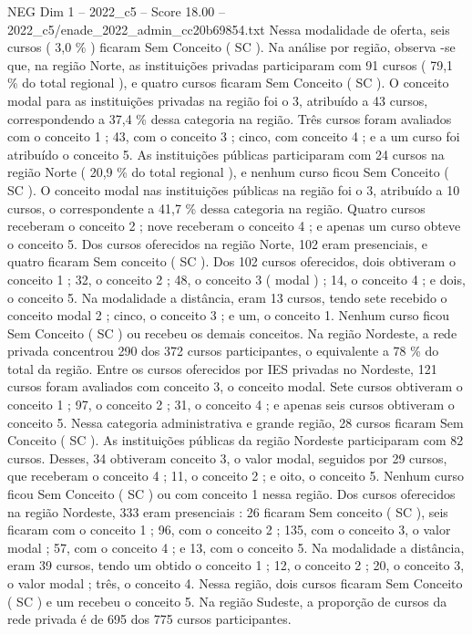 \begin{textsample}{NEG Dim 1 – 2022\_c5 – Score 18.00 – 2022\_c5/enade\_2022\_admin\_cc20b69854.txt}
Nessa modalidade de oferta, seis cursos ( 3,0 \% ) ficaram Sem Conceito ( SC ).
Na análise por região, observa -se que, na região Norte, as instituições privadas participaram com 91 cursos ( 79,1 \% do total regional ), e quatro cursos ficaram Sem Conceito ( SC ).
O conceito modal para as instituições privadas na região foi o 3, atribuído a 43 cursos, correspondendo a 37,4 \% dessa categoria na região.
Três cursos foram avaliados com o conceito 1 ; 43, com o conceito 3 ; cinco, com conceito 4 ; e a um curso foi atribuído o conceito 5.
As instituições públicas participaram com 24 cursos na região Norte ( 20,9 \% do total regional ), e nenhum curso ficou Sem Conceito ( SC ).
O conceito modal nas instituições públicas na região foi o 3, atribuído a 10 cursos, o correspondente a 41,7 \% dessa categoria na região.
Quatro cursos receberam o conceito 2 ; nove receberam o conceito 4 ; e apenas um curso obteve o conceito 5.
Dos cursos oferecidos na região Norte, 102 eram presenciais, e quatro ficaram Sem conceito ( SC ).
Dos 102 cursos oferecidos, dois obtiveram o conceito 1 ; 32, o conceito 2 ; 48, o conceito 3 ( modal ) ; 14, o conceito 4 ; e dois, o conceito 5.
Na modalidade a distância, eram 13 cursos, tendo sete recebido o conceito modal 2 ; cinco, o conceito 3 ; e um, o conceito 1.
Nenhum curso ficou Sem Conceito ( SC ) ou recebeu os demais conceitos.
Na região Nordeste, a rede privada concentrou 290 dos 372 cursos participantes, o equivalente a 78 \% do total da região.
Entre os cursos oferecidos por IES privadas no Nordeste, 121 cursos foram avaliados com conceito 3, o conceito modal.
Sete cursos obtiveram o conceito 1 ; 97, o conceito 2 ; 31, o conceito 4 ; e apenas seis cursos obtiveram o conceito 5.
Nessa categoria administrativa e grande região, 28 cursos ficaram Sem Conceito ( SC ).
As instituições públicas da região Nordeste participaram com 82 cursos.
Desses, 34 obtiveram conceito 3, o valor modal, seguidos por 29 cursos, que receberam o conceito 4 ; 11, o conceito 2 ; e oito, o conceito 5.
Nenhum curso ficou Sem Conceito ( SC ) ou com conceito 1 nessa região.
Dos cursos oferecidos na região Nordeste, 333 eram presenciais : 26 ficaram Sem conceito ( SC ), seis ficaram com o conceito 1 ; 96, com o conceito 2 ; 135, com o conceito 3, o valor modal ; 57, com o conceito 4 ; e 13, com o conceito 5.
Na modalidade a distância, eram 39 cursos, tendo um obtido o conceito 1 ; 12, o conceito 2 ; 20, o conceito 3, o valor modal ; três, o conceito 4.
Nessa região, dois cursos ficaram Sem Conceito ( SC ) e um recebeu o conceito 5.
Na região Sudeste, a proporção de cursos da rede privada é de 695 dos 775 cursos participantes.

\end{textsample}
